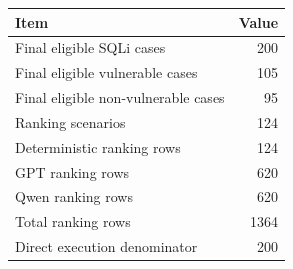 \begin{tabular}{lr}
\toprule
Item & Value \\
\midrule
Final eligible SQLi cases & 200 \\
Final eligible vulnerable cases & 105 \\
Final eligible non-vulnerable cases & 95 \\
Ranking scenarios & 124 \\
Deterministic ranking rows & 124 \\
GPT ranking rows & 620 \\
Qwen ranking rows & 620 \\
Total ranking rows & 1364 \\
Direct execution denominator & 200 \\
\bottomrule
\end{tabular}
